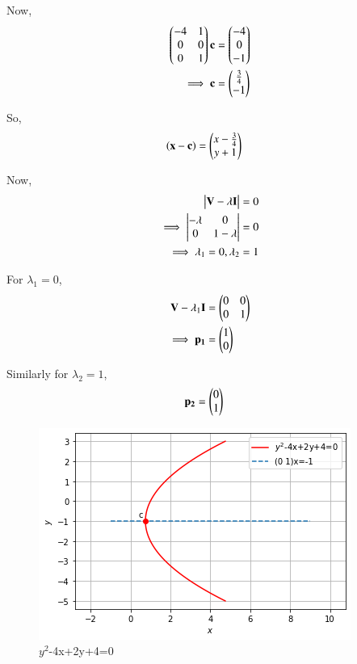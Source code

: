 \begin{enumerate}
    Now,
    \begin{align}
    \begin{pmatrix}-4 & 1 \\ 0 & 0 \\ 0 & 1\end{pmatrix}\mathbf{c} &= \begin{pmatrix}-4 \\ 0 \\ -1\end{pmatrix}
    \\
    \implies \mathbf{c} &= \begin{pmatrix}\frac{3}{4} \\ -1\end{pmatrix}
    \end{align}

    So,
    \begin{align}
    \left(\mathbf{x}-\mathbf{c}\right) &= \begin{pmatrix}x-\frac{3}{4} \\  y+1\end{pmatrix}
    \end{align}
    
    Now,
    \begin{align}
        \begin{vmatrix}\mathbf{V}-\lambda\mathbf{I}\end{vmatrix} &= 0 \\
        \implies \begin{vmatrix}-\lambda & 0 \\ 0 & 1-\lambda\end{vmatrix} &= 0 \\
        \implies \lambda_1 =0,\lambda_2 &= 1
    \end{align}
    
    For $\lambda_1=0$,
    \begin{align}
        \mathbf{V}-\lambda_1\mathbf{I} &= \begin{pmatrix}0 & 0 \\ 0 & 1\end{pmatrix} \\
        \implies \mathbf{p_1} &= \begin{pmatrix}1 \\ 0\end{pmatrix}
    \end{align}
    
    Similarly for $\lambda_2=1$,
    \begin{align}
        \mathbf{p_2} &=\begin{pmatrix}0 \\ 1\end{pmatrix}
    \end{align}
    
    \begin{figure}[!ht]
    \centering
    \includegraphics[width=\columnwidth]{app/2/Figures/ChallengeProblem5_2.png}
    \caption{$y^2$-4x+2y+4=0}
    \label{quadform/app/2/ex2}	
    \end{figure}
   

\end{enumerate}
